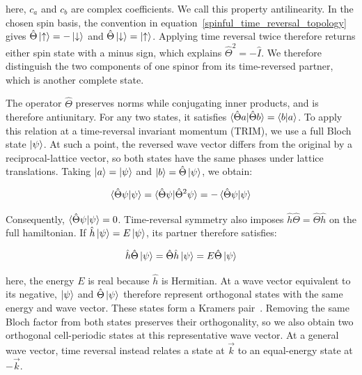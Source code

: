 here, $c_a$ and $c_b$ are complex coefficients.
We call this property antilinearity.
In the chosen spin basis, the convention in equation~\eqref{spinful_time_reversal_topology} gives
$\hat{\Theta}\ket{\uparrow}=-\ket{\downarrow}$ and
$\hat{\Theta}\ket{\downarrow}=\ket{\uparrow}$.
Applying time reversal twice therefore returns either spin state with a minus sign,
which explains $\hat{\Theta}^2=-\hat{I}$.
We therefore distinguish the two components of one spinor from its time-reversed partner, which is another complete state.

The operator $\hat{\Theta}$ preserves norms while conjugating inner products, and is therefore antiunitary.
For any two states, it satisfies
$\braket{\hat{\Theta}a|\hat{\Theta}b}=\braket{b|a}$.
To apply this relation at a time-reversal invariant momentum (TRIM), we use a full Bloch state $\ket{\psi}$.
At such a point, the reversed wave vector differs from the original by a reciprocal-lattice vector,
so both states have the same phases under lattice translations.
Taking $\ket{a}=\ket{\psi}$ and $\ket{b}=\hat{\Theta}\ket{\psi}$, we obtain:

\begin{equation}
    \braket{\hat{\Theta}\psi|\psi}
    =\braket{\hat{\Theta}\psi|\hat{\Theta}^2\psi}
    =-\braket{\hat{\Theta}\psi|\psi}
\label{kramers_orthogonality_topology}
\end{equation}

Consequently, $\braket{\hat{\Theta}\psi|\psi}=0$.
Time-reversal symmetry also imposes $\hat{h}\hat{\Theta}=\hat{\Theta}\hat{h}$ on the full hamiltonian.
If $\hat{h}\ket{\psi}=E\ket{\psi}$, its partner therefore satisfies:

\begin{equation}
    \hat{h}\hat{\Theta}\ket{\psi}
    =\hat{\Theta}\hat{h}\ket{\psi}
    =E\hat{\Theta}\ket{\psi}
\label{kramers_equal_energy_topology}
\end{equation}

here, the energy $E$ is real because $\hat{h}$ is Hermitian.
At a wave vector equivalent to its negative, $\ket{\psi}$ and $\hat{\Theta}\ket{\psi}$
therefore represent orthogonal states with the same energy and wave vector.
These states form a Kramers pair~\cite{dresselhaus2008group}.
Removing the same Bloch factor from both states preserves their orthogonality,
so we also obtain two orthogonal cell-periodic states at this representative wave vector.
At a general wave vector, time reversal instead relates a state at $\vec{k}$ to an equal-energy state at $-\vec{k}$.
